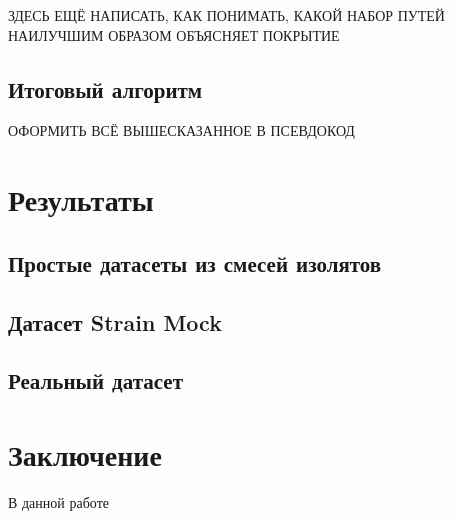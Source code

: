 \documentclass{spbau-diploma}
\begin{document}
ЗДЕСЬ ЕЩЁ НАПИСАТЬ, КАК ПОНИМАТЬ, КАКОЙ НАБОР ПУТЕЙ НАИЛУЧШИМ ОБРАЗОМ ОБЪЯСНЯЕТ ПОКРЫТИЕ

\subsection{Итоговый алгоритм}

ОФОРМИТЬ ВСЁ ВЫШЕСКАЗАННОЕ В ПСЕВДОКОД



\section{Результаты}
\subsection{Простые датасеты из смесей изолятов}
\subsection{Датасет Strain Mock}
\subsection{Реальный датасет} \label{infant_gut_section}






\section*{Заключение}
В данной работе 








\end{document}
